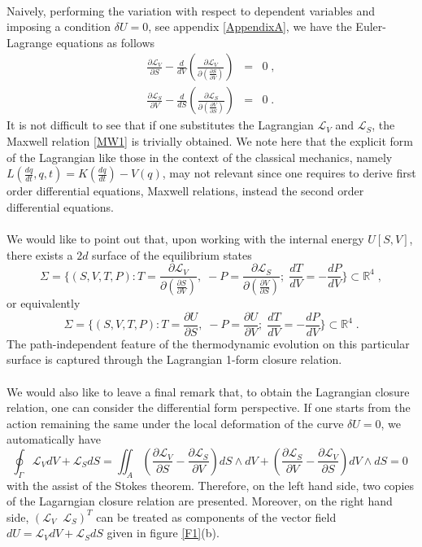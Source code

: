 \documentclass[12pt]{article}
\numberwithin{equation}{section}
\theoremstyle{remark}
\theoremstyle{definition}
\newcommand{\nn}{\nonumber}
\begin{document}
\phantom{d}
\\
Naively, performing the variation with respect to dependent variables and imposing a condition $\delta U=0$, see appendix \ref{AppendixA}, we have the Euler-Lagrange equations as follows
\begin{eqnarray}
    \frac{\partial \mathcal{L}_V}{\partial S}-\frac{d}{dV}\left(\frac{\partial \mathcal{L}_V}{\partial\left(\frac{\partial S}{\partial V}\right)}\right)&=&0\;,\\
    \frac{\partial \mathcal{L}_S}{\partial V}-\frac{d}{dS}\left(\frac{\partial \mathcal{L}_S}{\partial\left(\frac{\partial V}{\partial S}\right)}\right)&=&0\;.
\end{eqnarray}
It is not difficult to see that if one substitutes the Lagrangian $\mathcal{L}_V$ and $\mathcal{L}_S$, the Maxwell relation \eqref{MW1} is trivially obtained. We note here that the explicit form of the Lagrangian like those in the context of the classical mechanics, namely $L\left( \frac{dq}{dt},q,t\right)=K\left(\frac{dq}{dt}\right)-V(q)$, may not relevant since one requires to derive first order differential equations, Maxwell relations, instead the second order differential equations.
\\
\\
We would like to point out that, upon working with the internal energy $U[S,V]$, there exists a $2d$ surface of the equilibrium states
\begin{equation}
    \Sigma=\Big\{(S,V,T,P): T=\frac{\partial \mathcal{L}_V}{\partial \left(\frac{\partial S}{\partial V}\right)}, \;-P=\frac{\partial \mathcal{L}_S}{\partial \left(\frac{\partial V}{\partial S}\right)};\; \frac{dT}{dV}=-\frac{dP}{dV}\Big\} \subset \mathbb{R}^4\;,\nn
\end{equation}
or equivalently
\begin{equation}
    \Sigma=\Big\{(S,V,T,P): T=\frac{\partial U}{\partial S},\; -P=\frac{\partial U}{\partial V};\; \frac{dT}{dV}=-\frac{dP}{dV}\Big\} \subset \mathbb{R}^4\;.\nn
\end{equation}
The path-independent feature of the thermodynamic evolution on this particular surface is captured through the Lagrangian 1-form closure relation.
\\
\\
We would also like to leave a final remark that, to obtain the Lagrangian closure relation, one can consider the differential form perspective. If one starts from the action remaining the same under the local deformation of the curve $\delta U=0$, we automatically have
\begin{equation}
    \oint_\Gamma \mathcal{L}_VdV+\mathcal{L}_SdS=\iint_A\left(\frac{\partial \mathcal{L}_V}{\partial S}-\frac{\partial \mathcal{L}_S}{\partial V}\right)dS\wedge dV+\left(\frac{\partial \mathcal{L}_S}{\partial V}-\frac{\partial \mathcal{L}_V}{\partial S}\right)dV\wedge dS=0\;
\end{equation}
with the assist of the Stokes theorem. Therefore, on the left hand side, two copies of the Lagarngian closure relation are presented. Moreover, on the right hand side, $(\mathcal{L}_V\;\;\mathcal{L}_S)^T$ can be treated as components of the vector field $dU=\mathcal L_VdV+\mathcal L_SdS$ given in figure \ref{F1}(b).
\end{document}
